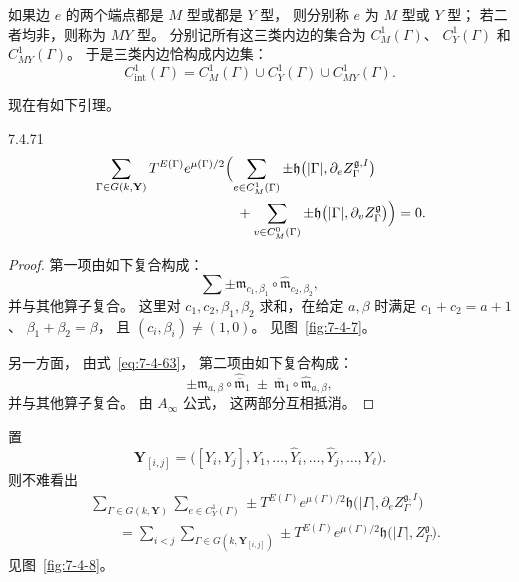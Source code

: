 如果边 $e$ 的两个端点都是
$M$ 型或都是 $Y$ 型，
则分别称 $e$ 为 $M$ 型或 $Y$ 型；
若二者均非，则称为 $MY$ 型。
分别记所有这三类内边的集合为
$C_M^1(\Gamma)$、
$C_Y^1(\Gamma)$
和 $C_{MY}^1(\Gamma)$。
于是三类内边恰构成内边集：
\[
C_{\mathrm{int}}^1(\Gamma)
=C_M^1(\Gamma)
\cup C_Y^1(\Gamma)
\cup C_{MY}^1(\Gamma).
\]

现在有如下引理。

\begin{lemma}{7.4.71}\label{lem:7-4-71}
\[
\begin{aligned}
&\sum_{\Gamma\in G(k,\mathbf Y)}
T^{E(\Gamma)}e^{\mu(\Gamma)/2}
\Bigl(
\sum_{e\in C_M^1(\Gamma)}
\pm\mathfrak h\bigl(
|\Gamma|,
\partial_e Z_\Gamma^{\mathfrak g,I}
\bigr)\\
&\hspace{36mm}
+
\sum_{v\in C_M^0(\Gamma)}
\pm\mathfrak h\bigl(
|\Gamma|,
\partial_v Z_\Gamma^{\mathfrak g}
\bigr)
\Bigr)=0.
\end{aligned}
\]
\end{lemma}

\begin{proof}
第一项由如下复合构成：
\[
\sum\pm
\mathfrak m_{c_1,\beta_1}
\circ
\widehat{\mathfrak m}_{c_2,\beta_2},
\]
并与其他算子复合。
这里对
$c_1,c_2,\beta_1,\beta_2$
求和，在给定 $a,\beta$ 时满足
$c_1+c_2=a+1$、
$\beta_1+\beta_2=\beta$，
且
$(c_i,\beta_i)\ne(1,0)$。
见图~\ref{fig:7-4-7}。


另一方面，
由式~\eqref{eq:7-4-63}，
第二项由如下复合构成：
\[
\pm\mathfrak m_{a,\beta}
\circ\widehat{\overline{\mathfrak m}}_1
\ \pm\
\overline{\mathfrak m}_1
\circ\widehat{\mathfrak m}_{a,\beta},
\]
并与其他算子复合。
由 $A_\infty$ 公式，
这两部分互相抵消。
\end{proof}

置
\[
\mathbf Y_{[i,j]}
=\bigl(
[Y_i,Y_j],
Y_1,\ldots,\widehat Y_i,\ldots,
\widehat Y_j,\ldots,Y_\ell
\bigr).
\]
则不难看出
\begin{equation}
\begin{aligned}
&\sum_{\Gamma\in G(k,\mathbf Y)}
\sum_{e\in C_Y^1(\Gamma)}
\pm T^{E(\Gamma)}e^{\mu(\Gamma)/2}
\mathfrak h\bigl(
|\Gamma|,
\partial_e Z_\Gamma^{\mathfrak g,I}
\bigr)\\
&\qquad=
\sum_{i<j}
\sum_{\Gamma\in G(k,\mathbf Y_{[i,j]})}
\pm T^{E(\Gamma)}e^{\mu(\Gamma)/2}
\mathfrak h\bigl(
|\Gamma|,Z_\Gamma^{\mathfrak g}
\bigr).
\end{aligned}
\tag{7.4.72}\label{eq:7-4-72}
\end{equation}
见图~\ref{fig:7-4-8}。

